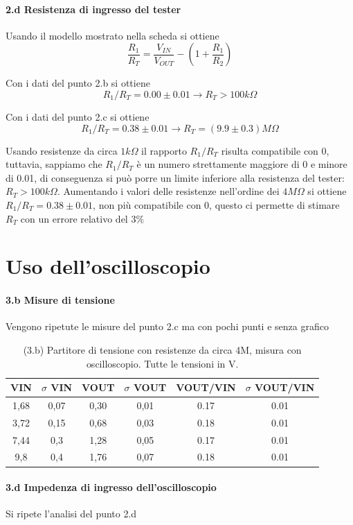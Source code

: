 \documentclass[10pt,a4paper]{article}
\begin{document}
\paragraph{2.d Resistenza di ingresso del tester}
Usando il modello mostrato nella scheda si ottiene
\[ \frac{R_1}{R_T} =  \frac{V_{IN}}{V_{OUT}} - (1 +  \frac{R_1}{R_2} )
\]

Con i dati del punto 2.b si ottiene
\[ R_1/R_T = 0.00  \pm  0.01   \rightarrow  R_T > 100 k\Omega
\]


Con i dati del punto 2.c si ottiene
\[ R_1/R_T = 0.38  \pm  0.01   \rightarrow  R_T = ( 9.9\pm  0.3)  M\Omega
\]

Usando resistenze da circa $1 k\Omega$ il rapporto $R_1/R_T$ risulta compatibile con 0, tuttavia, sappiamo che $R_1/R_T$ è un numero strettamente maggiore di 0 e minore di 0.01, di conseguenza si può porre un limite inferiore alla resistenza del tester: $R_T>100 k\Omega$. Aumentando i valori delle resistenze nell'ordine dei $4M\Omega$ si ottiene $R_1/R_T = 0.38  \pm  0.01$, non più compatibile con 0, questo ci permette di stimare $R_T$ con un errore relativo del $3\%$


\section{Uso dell'oscilloscopio}

\paragraph{3.b Misure di tensione} 
Vengono ripetute le misure del punto 2.c  ma con pochi punti e senza grafico
\begin{table}[h]
\centering
\begin{tabular}{|c|c|c|c|c|c|}
\hline 
VIN& $\sigma$ VIN  &VOUT	 & $\sigma$ VOUT& VOUT/VIN & $\sigma$ VOUT/VIN \\
\hline 
1,68 & 0,07 & 0,30 & 0,01 & 0.17 & 0.01\\
3,72 & 0,15 & 0,68 & 0,03 & 0.18 & 0.01 \\
7,44 & 0,3 & 1,28 & 0,05 & 0.17 & 0.01 \\
9,8 & 0,4 & 1,76 & 0,07 & 0.18 & 0.01 \\
\hline 
\end{tabular} 
\caption{(3.b) Partitore di tensione con resistenze da circa 4M, misura con oscilloscopio. Tutte le tensioni in V.}
\end{table}


\paragraph{3.d Impedenza di ingresso dell'oscilloscopio} Si ripete l'analisi del punto 2.d
\end{document}
